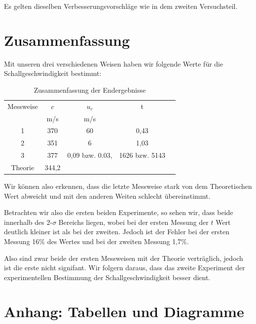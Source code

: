 \documentclass[11pt,a4paper]{article}
\begin{document}
Es gelten dieselben Verbesserungsvorschläge wie in dem zweiten Versuchsteil. 

\pagebreak

\section{Zusammenfassung}

Mit unseren drei verschiedenen Weisen haben wir folgende Werte f\"ur die Schallgeschwindigkeit bestimmt:

\begin{table}[h]
	\centering
	\begin{tabular*}{0.50\textwidth}{@{\extracolsep{\fill}}ccccc}
		\toprule
		Messweise & $c$ & $u_c$ & t\\
		& m/s&m/s &\\
		1 & 370 & 60 & 0,43 \\
		2 & 351 & 6 & 1,03\\
		3 & 377 & 0,09 bzw. 0.03, & 1626 bzw. 5143\\
		Theorie & 344,2 & \\
		\bottomrule
	\end{tabular*}
	\caption{Zusammenfassung der Endergebnisse}
\label{Table3}
\end{table}

Wir k\"onnen also erkennen, dass die letzte Messweise stark von dem Theoretischen Wert abweicht und mit den anderen Weiten schlecht \"ubereinstimmt.

Betrachten wir also die ersten beiden Experimente, so sehen wir, dass beide innerhalb des 2-$\sigma$ Bereichs liegen, wobei bei der ersten Messung der $t$ Wert deutlich kleiner ist als bei der zweiten. Jedoch ist der Fehler bei der ersten Messung 16\% des Wertes und bei der zweiten Messung 1,7\%.

Also sind zwar beide der ersten Messweisen mit der Theorie vertr\"aglich, jedoch ist die erste nicht signifant. Wir folgern daraus, dass das zweite Experiment der experimentellen Bestimmung der Schallgeschwindigkeit besser dient.



\section{Anhang: Tabellen und Diagramme}
\end{document}
